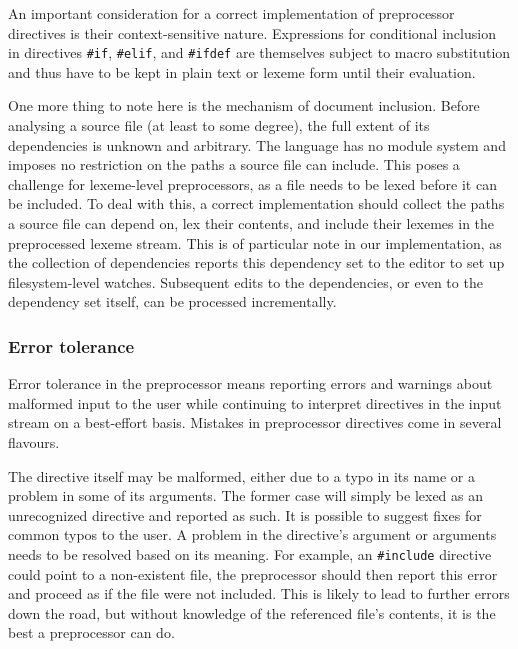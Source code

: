 An important consideration for a correct implementation of preprocessor
directives is their context-sensitive nature. Expressions for conditional
inclusion in directives \texttt{\#if}, \texttt{\#elif}, and \texttt{\#ifdef} are
themselves subject to macro substitution and thus have to be kept in plain text
or lexeme form until their evaluation.

One more thing to note here is the mechanism of document inclusion. Before
analysing a \pfs source file (at least to some degree), the full extent of its
dependencies is unknown and arbitrary. The language has no module system and
imposes no restriction on the paths a source file can include. This poses a
challenge for lexeme-level preprocessors, as a file needs to be lexed before it
can be included. To deal with this, a correct implementation should collect the
paths a source file can depend on, lex their contents, and include their lexemes
in the preprocessed lexeme stream. This is of particular note in our
implementation, as the collection of dependencies reports this dependency set to
the editor to set up filesystem-level watches. Subsequent edits to the
dependencies, or even to the dependency set itself, can be processed
incrementally.

\subsubsection*{Error tolerance}

Error tolerance in the preprocessor means reporting errors and warnings about
malformed input to the user while continuing to interpret directives in the
input stream on a best-effort basis. Mistakes in preprocessor directives come in
several flavours.

The directive itself may be malformed, either due to a typo in its name or a
problem in some of its arguments. The former case will simply be lexed as an
unrecognized directive and reported as such. It is possible to suggest fixes for
common typos to the user. A problem in the directive's argument or arguments
needs to be resolved based on its meaning. For example, an \texttt{\#include}
directive could point to a non-existent file, the preprocessor should then
report this error and proceed as if the file were not included. This is likely
to lead to further errors down the road, but without knowledge of the referenced
file's contents, it is the best a preprocessor can do.

